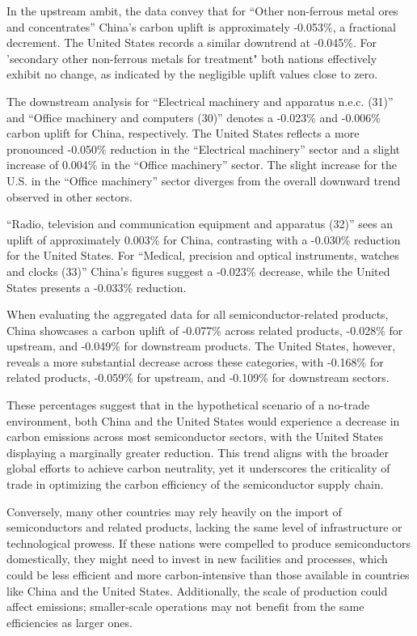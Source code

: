 In the upstream ambit, the data convey that for ``Other non-ferrous metal ores and concentrates'' China's carbon uplift is approximately -0.053\%, a fractional decrement. The United States records a similar downtrend at -0.045\%. For 'secondary other non-ferrous metals for treatment" both nations effectively exhibit no change, as indicated by the negligible uplift values close to zero.

The downstream analysis for ``Electrical machinery and apparatus n.e.c. (31)'' and ``Office machinery and computers (30)'' denotes a -0.023\% and -0.006\% carbon uplift for China, respectively. The United States reflects a more pronounced -0.050\% reduction in the ``Electrical machinery'' sector and a slight increase of 0.004\% in the ``Office machinery'' sector. The slight increase for the U.S. in the ``Office machinery'' sector diverges from the overall downward trend observed in other sectors.

``Radio, television and communication equipment and apparatus (32)'' sees an uplift of approximately 0.003\% for China, contrasting with a -0.030\% reduction for the United States. For ``Medical, precision and optical instruments, watches and clocks (33)'' China's figures suggest a -0.023\% decrease, while the United States presents a -0.033\% reduction.

When evaluating the aggregated data for all semiconductor-related products, China showcases a carbon uplift of -0.077\% across related products, -0.028\% for upstream, and -0.049\% for downstream products. The United States, however, reveals a more substantial decrease across these categories, with -0.168\% for related products, -0.059\% for upstream, and -0.109\% for downstream sectors.

These percentages suggest that in the hypothetical scenario of a no-trade environment, both China and the United States would experience a decrease in carbon emissions across most semiconductor sectors, with the United States displaying a marginally greater reduction. This trend aligns with the broader global efforts to achieve carbon neutrality, yet it underscores the criticality of trade in optimizing the carbon efficiency of the semiconductor supply chain.

Conversely, many other countries may rely heavily on the import of semiconductors and related products, lacking the same level of infrastructure or technological prowess. If these nations were compelled to produce semiconductors domestically, they might need to invest in new facilities and processes, which could be less efficient and more carbon-intensive than those available in countries like China and the United States. Additionally, the scale of production could affect emissions; smaller-scale operations may not benefit from the same efficiencies as larger ones.


